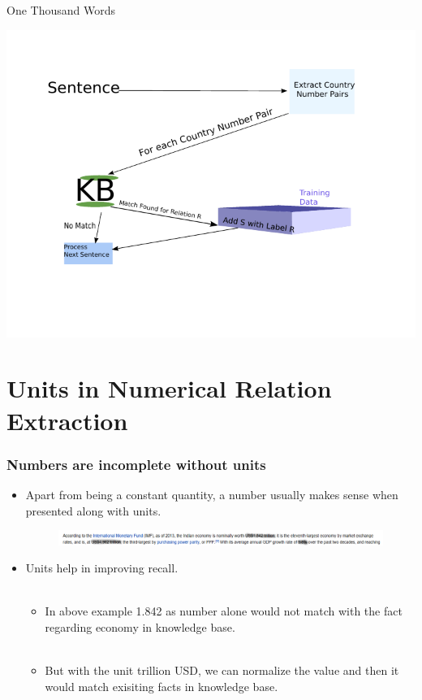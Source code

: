 \documentclass{beamer}
\begin{document}
\begin{frame}{One Thousand Words}
 \begin{center}
 \includegraphics{./imgs/simple.pdf}
\end{center}

\end{frame}

\section{Units in Numerical Relation Extraction}
\begin{frame}
 
 \frametitle{Numbers are incomplete without units} \pause
 
 \begin{itemize}
  
  \item  Apart from being a constant quantity, a number usually makes sense when presented along with units. \pause
  
    \begin{figure}
    \centering
    \includegraphics[width = 1.0\textwidth]{images/ex_6}
  \end{figure}
  \pause 
  \item Units help in improving recall.  \pause \\~\\ 
  
  \begin{itemize}
      \item In above example 1.842 as number alone would not match with the fact regarding economy in knowledge base. \pause \\~\\
      \item But with the unit trillion USD, we can normalize the value and then it would match exisiting facts in knowledge base. 
      
  \end{itemize}
  \end{itemize}
  \end{frame}
\end{document}
